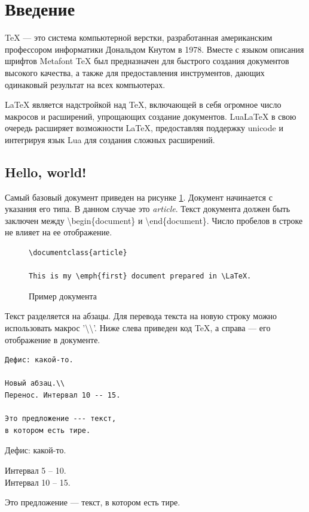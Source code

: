 \section{Введение}
TeX --- это система компьютерной верстки, разработанная американским профессором информатики Дональдом Кнутом в 1978.
Вместе с языком описания шрифтов Metafont TeX был предназначен для быстрого создания документов высокого качества, а также для предоставления инструментов, дающих одинаковый результат на всех компьютерах.

LaTeX является надстройкой над TeX, включающей в себя огромное число макросов и расширений, упрощающих создание документов.
LuaLaTeX в свою очередь расширяет возможности LaTeX, предоставляя поддержку unicode и интегрируя язык Lua для создания сложных расширений.

\subsection{Hello, world!}
Самый базовый документ приведен на рисунке \ref{f1}.
Документ начинается с указания его типа.
В данном случае это {\em article}.
Текст документа должен быть заключен между {\textbackslash}begin\{document\} и {\textbackslash}end\{document\}.
Число пробелов в строке не влияет на ее отображение.

\begin{figure}[b]  %
  \centering
\begin{verbatim}
\documentclass{article}

This is my \emph{first} document prepared in \LaTeX.

\end{verbatim}
\caption{Пример документа}
\label{f1}
\end{figure}

Текст разделяется на абзацы.
Для перевода текста на новую строку можно использовать макрос '{\textbackslash}{\textbackslash}'.
Ниже слева приведен код TeX, а справа --- его отображение в документе.
\begin{multicols}{2}
\begin{verbatim}
Дефис: какой-то.

Новый абзац.\\
Перенос. Интервал 10 -- 15.

Это предложение --- текст,
в котором есть тире.
\end{verbatim}
  \columnbreak
Дефис: какой-то.

Интервал 5 -- 10.\\
Интервал 10 -- 15.

Это предложение --- текст,
в котором есть тире.
\end{multicols}

